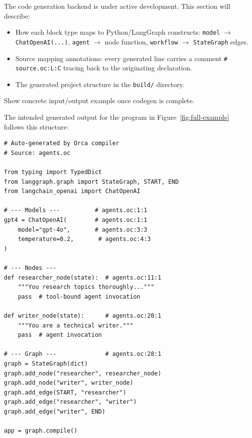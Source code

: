 \documentclass[sigconf,nonacm]{acmart}
\begin{document}
\begin{todobox}
The code generation backend is under active development. This section will
describe:
\begin{itemize}
  \item How each block type maps to Python/LangGraph constructs:
        \texttt{model} $\rightarrow$ \texttt{ChatOpenAI(...)},
        \texttt{agent} $\rightarrow$ node function,
        \texttt{workflow} $\rightarrow$ \texttt{StateGraph} edges.
  \item Source mapping annotations: every generated line carries a comment
        \texttt{\# source.oc:L:C} tracing back to the originating
        declaration.
  \item The generated project structure in the \texttt{build/} directory.
\end{itemize}
Show concrete input/output example once codegen is complete.
\end{todobox}

The intended generated output for the program in Figure~\ref{fig:full-example}
follows this structure:

\begin{lstlisting}[style=pythonStyle,caption={Expected generated Python
  for a two-agent workflow (illustrative).},label={fig:generated}]
# Auto-generated by Orca compiler
# Source: agents.oc

from typing import TypedDict
from langgraph.graph import StateGraph, START, END
from langchain_openai import ChatOpenAI

# --- Models ---          # agents.oc:1:1
gpt4 = ChatOpenAI(        # agents.oc:1:1
    model="gpt-4o",       # agents.oc:3:3
    temperature=0.2,       # agents.oc:4:3
)

# --- Nodes ---
def researcher_node(state):  # agents.oc:11:1
    """You research topics thoroughly..."""
    pass  # tool-bound agent invocation

def writer_node(state):      # agents.oc:20:1
    """You are a technical writer."""
    pass  # agent invocation

# --- Graph ---              # agents.oc:28:1
graph = StateGraph(dict)
graph.add_node("researcher", researcher_node)
graph.add_node("writer", writer_node)
graph.add_edge(START, "researcher")
graph.add_edge("researcher", "writer")
graph.add_edge("writer", END)

app = graph.compile()
\end{lstlisting}

\end{document}
